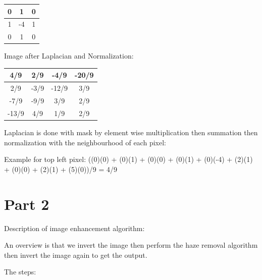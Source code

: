\documentclass[conference]{IEEEtran}
\begin{document}
\begin{center}
\begin{tabular}{ |c|c|c| } 
\hline
0 & 1 & 0\\ \hline
1 & -4 & 1\\ \hline
0 & 1 & 0\\ \hline
\end{tabular}
\end{center}

Image after Laplacian and Normalization:

\begin{center}
\begin{tabular}{ |c|c|c|c| } 
\hline
4/9 & 2/9 & -4/9 & -20/9 \\ \hline
2/9 & -3/9 & -12/9 & 3/9\\ \hline
-7/9 & -9/9 & 3/9 & 2/9\\ \hline
-13/9 & 4/9 & 1/9 & 2/9 \\ \hline
\end{tabular}
\end{center}

Laplacian is done with mask by element wise multiplication then summation then normalization with the neighbourhood of each pixel:

Example for top left pixel: ((0)(0) + (0)(1) + (0)(0) + (0)(1) + (0)(-4) + (2)(1) + (0)(0) + (2)(1) + (5)(0))/9 = 4/9

\section*{Part 2}

Description of image enhancement algorithm:

An overview is that we invert the image then perform the haze removal algorithm then invert the image again to get the output.

The steps:
\end{document}
